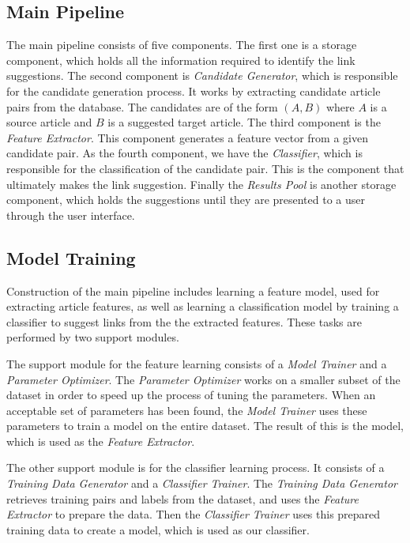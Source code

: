 \subsection{Main Pipeline}
The main pipeline consists of five components. The first one is a storage component, which holds all the information required to identify the link suggestions. The second component is \emph{Candidate Generator}, which is responsible for the candidate generation process. It works by extracting candidate article pairs from the database. The candidates are of the form $(A,B)$ where $A$ is a source article and $B$ is a suggested target article. The third component is the \emph{Feature Extractor}. This component generates a feature vector from a given candidate pair. As the fourth component, we have the \emph{Classifier}, which is responsible for the classification of the candidate pair. This is the component that ultimately makes the link suggestion. Finally the \emph{Results Pool} is another storage component, which holds the suggestions until they are presented to a user through the user interface.




\subsection{Model Training}
Construction of the main pipeline includes learning a feature model, used for extracting article features, as well as learning a classification model by training a classifier to suggest links from the the extracted features. These tasks are performed by two support modules.

The support module for the feature learning consists of a \emph{Model Trainer} and a \emph{Parameter Optimizer}. The \emph{Parameter Optimizer} works on a smaller subset of the dataset in order to speed up the process of tuning the parameters. When an acceptable set of parameters has been found, the \emph{Model Trainer} uses these parameters to train a model on the entire dataset. The result of this is the model, which is used as the \emph{Feature Extractor}.

The other support module is for the classifier learning process. It consists of a \emph{Training Data Generator} and a \emph{Classifier Trainer}. The \emph{Training Data Generator} retrieves training pairs and labels from the dataset, and uses the \emph{Feature Extractor} to prepare the data. Then the \emph{Classifier Trainer} uses this prepared training data to create a model, which is used as our classifier.

